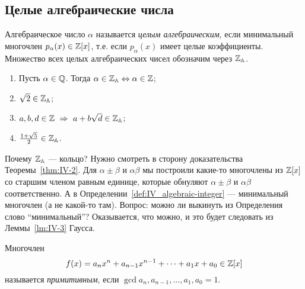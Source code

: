 \subsection{Целые алгебраические числа}
\label{subsec:IV-2}

\begin{ndefinition}
\label{def:IV_algebraic-integer}
    Алгебраическое число $\alpha$ называется \emph{целым алгебраическим}, если минимальный многочлен $p_{\alpha}(x) \in \mathbb{Z}[x]$, т.е. если $p_{\alpha}(x)$ имеет целые коэффициенты. Множество всех целых алгебраических чисел обозначим через $\mathbb{Z}_{\mathbb{A}}$.
\end{ndefinition}

\begin{example}
\hfill
    \begin{enumerate}
        \item
            Пусть $\alpha \in \mathbb{Q}$. Тогда $\alpha \in \mathbb{Z}_{\mathbb{A}} \Leftrightarrow \alpha \in \mathbb{Z}$;
        \item
            $\sqrt{2} \in \mathbb{Z}_{\mathbb{A}}$;
        \item
            $a, b, d \in \mathbb{Z} \ \Rightarrow \ a + b\sqrt{d} \in \mathbb{Z}_{\mathbb{A}}$;
        \item
            $\frac{1 + \sqrt{5}}{2} \in \mathbb{Z}_{\mathbb{A}}$.
    \end{enumerate}
\end{example}

\begin{remark}[Анонс!]
    Почему $\mathbb{Z}_{\mathbb{A}}$ --- кольцо? Нужно смотреть в сторону доказательства Теоремы~\ref{thm:IV-2}. Для $\alpha \pm \beta$ и $\alpha\beta$ мы построили какие-то многочлены из $\mathbb{Z}[x]$ со старшим членом равным единице, которые обнуляют $\alpha \pm \beta$ и $\alpha\beta$ соответственно. А в Определении~\ref{def:IV_algebraic-integer} --- минимальный многочлен (а не какой-то там). Вопрос: можно ли выкинуть из Определения слово ``минимальный''? Оказывается, что можно, и это будет следовать из Леммы~\ref{lm:IV-3} Гаусса.
\end{remark}

\begin{ndefinition}
\label{def:IV_primitive-polynomial}
    Многочлен 
    \[
        f(x) = a_nx^n + a_{n-1}x^{n-1} + \dots + a_1x + a_0 \in \mathbb{Z}[x]
    \]
    называется \emph{примитивным}, если $\gcd{a_n, a_{n-1}, \dots, a_1, a_0} = 1$.
\end{ndefinition}

